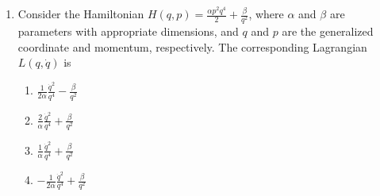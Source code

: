 \documentclass[journal,12pt,onecolumn]{IEEEtran}
\theoremstyle{remark}
\begin{document}
\begin{enumerate}
\item Consider the Hamiltonian $ H(q, p) = \frac{\alpha p^2 q^4}{2} + \frac{\beta}{q^2} $, where $\alpha$ and $\beta$ are parameters with appropriate dimensions, and $q$ and $p$ are the generalized coordinate and momentum, respectively. The corresponding Lagrangian $L(q, \dot{q})$ is
\begin{multicols}{4}
\begin{enumerate}
	\item $ \frac{1}{2 \alpha} \frac{\dot{q}^2}{q^{4}} - \frac{\beta}{q^2} $
	\item $\frac{2}{\alpha} \frac{\dot{q}^2}{q^{4}} + \frac{\beta}{q^2}$
	\item $\frac{1}{\alpha} \frac{\dot{q}^2}{q^{4}} + \frac{\beta}{q^2}$
	\item $ -\frac{1}{2 \alpha} \frac{\dot{q}^2}{q^{4}} + \frac{\beta}{q^2}$
\end{enumerate}
\end{multicols}

\end{enumerate}
\end{document}
